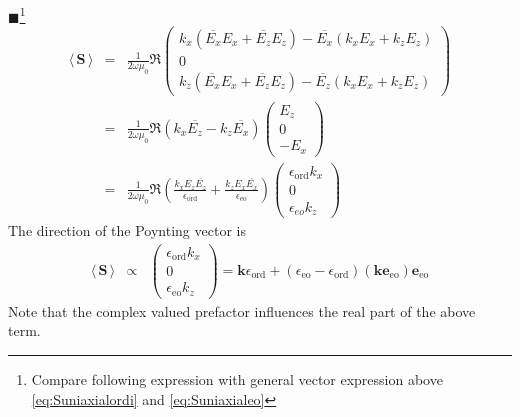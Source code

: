\documentclass[12pt,a4paper,twoside,openright,BCOR10mm,headsepline,titlepage,abstracton,chapterprefix,final]{scrreprt}
\newcommand\Vector[1]{{\mathbf{#1}}}
\newcommand\vacuum{0}
\newcommand\wavenumber{k}
\newcommand\Wavevector{\Vector{\wavenumber}}
\newcommand\scalarEfield{E}
\newcommand\vacuumpermeability{\mu_{\vacuum}}
\newcommand\scalarpermittivity{\epsilon}
\newcommand\ordi{\text{ord}}
\newcommand\eo{\text{eo}}
\newcommand{\timeavg}[1]{{\langle\,#1\,\rangle}}
\newcommand{\remark}[1]{{\color{red}$\blacksquare$}\footnote{{\color{red}#1}}}
\begin{document}
\remark{Compare following expression with general vector expression above \eqref{eq:Suniaxialordi} and \eqref{eq:Suniaxialeo}}
\begin{eqnarray}
 \timeavg{\Vector{S}}
 &=& \frac{1}{2 \omega \vacuumpermeability} \Re 
   \begin{pmatrix}
     \wavenumber_x (\overline{\scalarEfield_x} \scalarEfield_x + \overline{\scalarEfield_z} \scalarEfield_z) - \overline{\scalarEfield_x} (\wavenumber_x \scalarEfield_x + \wavenumber_z \scalarEfield_z )
     \\
     0
     \\
     \wavenumber_z (\overline{\scalarEfield_x} \scalarEfield_x + \overline{\scalarEfield_z} \scalarEfield_z) - \overline{\scalarEfield_z} (\wavenumber_x \scalarEfield_x + \wavenumber_z \scalarEfield_z )     
   \end{pmatrix}
  \\
 &=& \frac{1}{2 \omega \vacuumpermeability} \Re 
   ( \wavenumber_x \overline{\scalarEfield_z} - \wavenumber_z \overline{\scalarEfield_x})
   \begin{pmatrix}
     \scalarEfield_z 
     \\
     0
     \\
     - \scalarEfield_x 
   \end{pmatrix}
  \\
 &=& \frac{1}{2 \omega \vacuumpermeability} \Re 
   \left( \frac{\wavenumber_x \scalarEfield_z \overline{\scalarEfield_z}}{\scalarpermittivity_{\ordi}} + \frac{\wavenumber_z \scalarEfield_x \overline{\scalarEfield_x}}{\scalarpermittivity_{\eo}} \right)
   \begin{pmatrix}
     \scalarpermittivity_{\ordi} \wavenumber_x 
     \\
     0
     \\
     \scalarpermittivity_{eo} \wavenumber_z 
   \end{pmatrix}
\end{eqnarray}
The direction of the Poynting vector is
\begin{eqnarray}
 \timeavg{\Vector{S}}
 &\propto&
   \begin{pmatrix}
     \scalarpermittivity_{\ordi} \wavenumber_x 
     \\
     0
     \\
     \scalarpermittivity_{\eo} \wavenumber_z 
   \end{pmatrix}
   =
   \Wavevector \scalarpermittivity_{\ordi} + (\scalarpermittivity_{\eo} - \scalarpermittivity_{\ordi}) (\Wavevector \Vector{e}_{\eo}) \Vector{e}_{\eo}
\end{eqnarray}
Note that the complex valued prefactor influences the real part of the above term.
\end{document}
